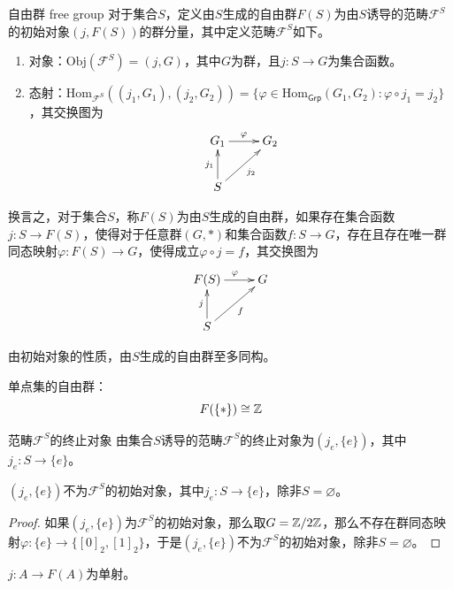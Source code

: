 \begin{definition}{自由群 free group}
	对于集合$S$，定义由$S$生成的自由群$F(S)$为由$S$诱导的范畴$\mathscr{F}^S$的初始对象$(j,F(S))$的群分量，其中定义范畴$\mathscr{F}^S$如下。
	\begin{enumerate}
		\item 对象：$\mathrm{Obj}(\mathscr{F}^S)=(j,G)$，其中$G$为群，且$j:S\to G$为集合函数。
		\item 态射：$\mathrm{Hom}_{\mathscr{F}^S}((j_1,G_1),(j_2,G_2))=\{ \varphi\in\mathrm{Hom}_{\mathsf{Grp}}(G_1,G_2): \varphi\circ j_1=j_2 \}$，其交换图为
		$$
		\xymatrix{
			G_1 \ar[r]^{\varphi} & G_2\\
			S \ar[u]^{j_1} \ar[ur]_{j_2}
		}
		$$
	\end{enumerate}
	换言之，对于集合$S$，称$F(S)$为由$S$生成的自由群，如果存在集合函数$j:S\to F(S)$，使得对于任意群$(G,*)$和集合函数$f:S\to G$，存在且存在唯一群同态映射$\varphi:F(S)\to G$，使得成立$\varphi\circ j=f$，其交换图为
	$$
	\xymatrix{
		F(S) \ar[r]^{\varphi} & G\\
		S \ar[u]^{j} \ar[ur]_{f}
	}
	$$
\end{definition}

\begin{remark}
	由初始对象的性质，由$S$生成的自由群至多同构。
\end{remark}

\begin{example}
	单点集的自由群：
	$$
	F(\{*\})\cong \mathbb{Z}
	$$
\end{example}

\begin{proposition}{范畴$\mathscr{F}^S$的终止对象}
	由集合$S$诱导的范畴$\mathscr{F}^S$的终止对象为$(j_e,\{e\})$，其中$j_e:S\to\{e\}$。
\end{proposition}

\begin{proposition}
	$(j_e,\{e\})$不为$\mathscr{F}^S$的初始对象，其中$j_e:S\to\{e\}$，除非$S=\varnothing$。
\end{proposition}

\begin{proof}
	如果$(j_e,\{e\})$为$\mathscr{F}^S$的初始对象，那么取$G=\mathbb{Z}/2\mathbb{Z}$，那么不存在群同态映射$\varphi:\{e\}\to \{[0]_2,[1]_2\}$，于是$(j_e,\{e\})$不为$\mathscr{F}^S$的初始对象，除非$S=\varnothing$。
\end{proof}

\begin{proposition}
	$j:A \to F(A)$为单射。
\end{proposition}

